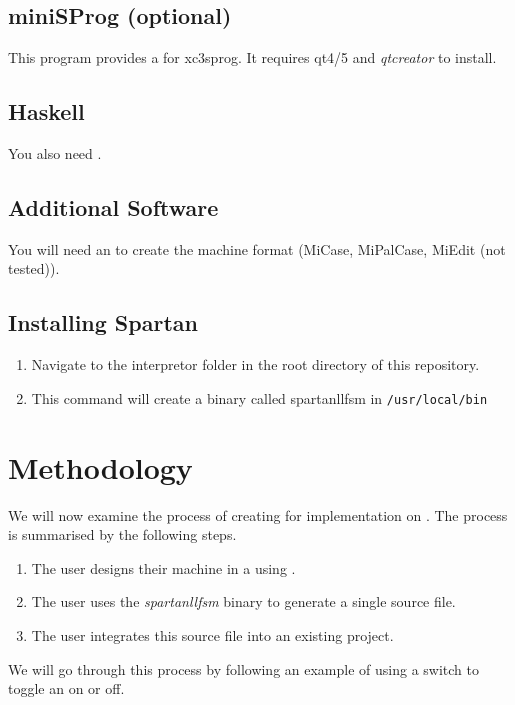 \documentclass{article}
\begin{document}
            \subsection{miniSProg (optional)}
                This program provides a \GUI\/ for xc3sprog. It requires qt4/5 and \textit{qtcreator} to install.
            \subsection{Haskell}
                You also need \ghc.
            \subsection{Additional \MiPal\/ Software}
                You will need an \IDE\/ to create the machine format (MiCase, MiPalCase, MiEdit (not tested)).
            \subsection{Installing Spartan \LLFSM}
                \begin{enumerate}
                    \item Navigate to the interpretor folder in the root directory of this repository.
                    \item This command will create a binary called spartanllfsm in \texttt{/usr/local/bin}
                \end{enumerate}
        \section{Methodology}
            We will now examine the process of creating \LLFSMs\/ for implementation on \FPGAs. The process is summarised by the following steps.
            \begin{enumerate}
                \item The user designs their machine in a \GUI\/ using \VHDL.
                \item The user uses the \textit{spartanllfsm} binary to generate a single \VHDL\/ source file.
                \item The user integrates this source file into an existing \ISE\/ project.
            \end{enumerate}
            We will go through this process by following an example of using a \DIP\/ switch to toggle an \LED\/ on or off.
\end{document}
